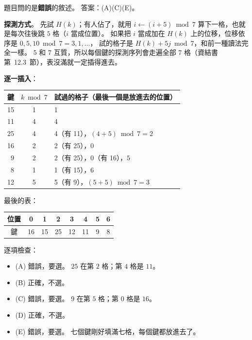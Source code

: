 \begin{pastsoln}
題目問的是\textbf{錯誤}的敘述。 答案：(A)(C)(E)。

\textbf{探測方式}。 先試 $H(k)$；有人佔了，就用 $i \gets (i + 5) \bmod 7$ 算下一格，也就是每次往後跳
$5$ 格（$i$ 當成位置）。 如果把 $i$ 當成加在 $H(k)$ 上的位移，位移依序是 $0, 5, 10 \bmod 7 = 3, 1, \ldots$，
試的格子是 $H(k) + 5j \bmod 7$，和前一種讀法完全一樣。 $5$ 和 $7$ 互質，所以每個鍵的探測序列會走遍全部
$7$ 格（資結書第~12.3~節），表沒滿就一定插得進去。

\textbf{逐一插入}：
\begin{center}
\small
\begin{tabular}{rcl}
\toprule
鍵 & $k \bmod 7$ & 試過的格子（最後一個是放進去的位置） \\
\midrule
15 & 1 & 1 \\
11 & 4 & 4 \\
25 & 4 & 4（有 11），$(4+5) \bmod 7 = 2$ \\
16 & 2 & 2（有 25），$0$ \\
9 & 2 & 2（有 25），0（有 16），$5$ \\
8 & 1 & 1（有 15），$6$ \\
12 & 5 & 5（有 9），$(5+5) \bmod 7 = 3$ \\
\bottomrule
\end{tabular}
\end{center}
最後的表：
\begin{center}
\small
\begin{tabular}{c*{7}{c}}
\toprule
位置 & 0 & 1 & 2 & 3 & 4 & 5 & 6 \\
\midrule
鍵 & 16 & 15 & 25 & 12 & 11 & 9 & 8 \\
\bottomrule
\end{tabular}
\end{center}

逐項檢查：
\begin{itemize}
\item (A) 錯誤，要選。 $25$ 在第 $2$ 格；第 $4$ 格是 $11$。
\item (B) 正確，不選。
\item (C) 錯誤，要選。 $9$ 在第 $5$ 格；第 $0$ 格是 $16$。
\item (D) 正確，不選。
\item (E) 錯誤，要選。 七個鍵剛好填滿七格，每個鍵都放進去了。
\end{itemize}
\end{pastsoln}
